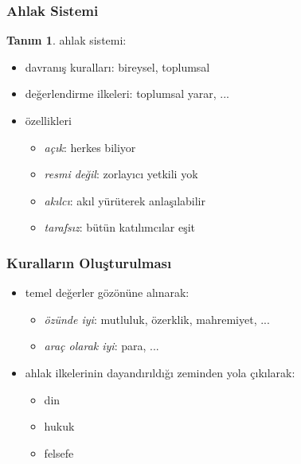 \documentclass[dvipsnames]{beamer}
\theoremstyle{definition}
\newtheorem{tanim}[theorem]{Tanım}
\theoremstyle{example}
\theoremstyle{plain}
\begin{document}
\begin{frame}
  \frametitle{Ahlak Sistemi}

  \begin{tanim}
    \alert{ahlak sistemi}:

    \begin{itemize}
      \item davranış kuralları: bireysel, toplumsal
      \item değerlendirme ilkeleri: toplumsal yarar, ...
    \end{itemize}
  \end{tanim}

  \pause
  \begin{itemize}
    \item{özellikleri
      \begin{itemize}
        \item \emph{açık}: herkes biliyor
        \item \emph{resmi değil}: zorlayıcı yetkili yok
        \item \emph{akılcı}: akıl yürüterek anlaşılabilir
        \item \emph{tarafsız}: bütün katılımcılar eşit
      \end{itemize}}
  \end{itemize}
\end{frame}

\begin{frame}
  \frametitle{Kuralların Oluşturulması}

  \begin{itemize}
    \item \alert{temel değerler} gözönüne alınarak:

    \begin{itemize}
      \item \emph{özünde iyi}: mutluluk, özerklik, mahremiyet, ...
      \item \emph{araç olarak iyi}: para, ...
    \end{itemize}

    \pause
    \item ahlak ilkelerinin dayandırıldığı \alert{zemin}den yola çıkılarak:

    \begin{itemize}
      \item din
      \item hukuk
      \item felsefe
    \end{itemize}
  \end{itemize}
\end{frame}
\end{document}
